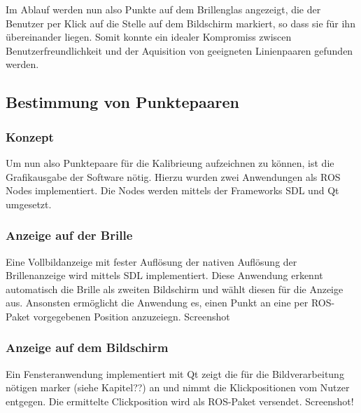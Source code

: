     Im Ablauf werden nun also Punkte auf dem Brillenglas angezeigt, die der Benutzer per Klick auf die Stelle auf dem Bildschirm markiert, so dass sie für ihn übereinander liegen. Somit konnte ein idealer Kompromiss zwiscen Benutzerfreundlichkeit und der Aquisition von geeigneten Linienpaaren gefunden werden.


\subsection{Bestimmung von Punktepaaren}
\subsubsection{Konzept}
Um nun also Punktepaare für die Kalibrieung aufzeichnen zu können, ist die Grafikausgabe der Software nötig. Hierzu wurden zwei Anwendungen als ROS Nodes implementiert. Die Nodes werden mittels der Frameworks SDL und Qt umgesetzt.
\subsubsection{Anzeige auf der Brille}
Eine Vollbildanzeige mit fester Auflösung der nativen Auflösung der Brillenanzeige wird mittels SDL implementiert. Diese Anwendung erkennt automatisch die Brille als zweiten Bildschirm und wählt diesen für die Anzeige aus. Ansonsten ermöglicht die Anwendung es, einen Punkt an eine per ROS-Paket vorgegebenen Position anzuzeiegn.
Screenshot
\subsubsection{Anzeige auf dem Bildschirm}
Ein Fensteranwendung implementiert mit Qt zeigt die für die Bildverarbeitung nötigen marker (siehe Kapitel??) an und nimmt die Klickpositionen vom Nutzer entgegen. Die ermittelte Clickposition wird als ROS-Paket versendet.
Screenshot!


